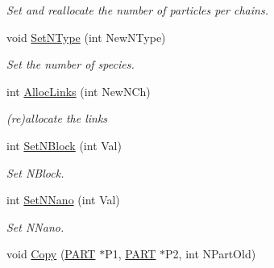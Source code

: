 \begin{DoxyCompactItemize}
\begin{DoxyCompactList}\small\item\em \-Set and reallocate the number of particles per chains. \end{DoxyCompactList}\item 
\hypertarget{classVarData_ab1caa779737fb8f3bb11375fd03cb4a7}{void \hyperlink{classVarData_ab1caa779737fb8f3bb11375fd03cb4a7}{\-Set\-N\-Type} (int \-New\-N\-Type)}\label{classVarData_ab1caa779737fb8f3bb11375fd03cb4a7}

\begin{DoxyCompactList}\small\item\em \-Set the number of species. \end{DoxyCompactList}\item 
\hypertarget{classVarData_a6dc8858a41c1a3851b2215c6460347bf}{int \hyperlink{classVarData_a6dc8858a41c1a3851b2215c6460347bf}{\-Alloc\-Links} (int \-New\-N\-Ch)}\label{classVarData_a6dc8858a41c1a3851b2215c6460347bf}

\begin{DoxyCompactList}\small\item\em (re)allocate the links \end{DoxyCompactList}\item 
\hypertarget{classVarData_a1ba38db0d91819c6627dbac8de45b6a7}{int \hyperlink{classVarData_a1ba38db0d91819c6627dbac8de45b6a7}{\-Set\-N\-Block} (int \-Val)}\label{classVarData_a1ba38db0d91819c6627dbac8de45b6a7}

\begin{DoxyCompactList}\small\item\em \-Set \-N\-Block. \end{DoxyCompactList}\item 
\hypertarget{classVarData_ad5e77b3ade14f7be0d91ccd0f5397cb6}{int \hyperlink{classVarData_ad5e77b3ade14f7be0d91ccd0f5397cb6}{\-Set\-N\-Nano} (int \-Val)}\label{classVarData_ad5e77b3ade14f7be0d91ccd0f5397cb6}

\begin{DoxyCompactList}\small\item\em \-Set \-N\-Nano. \end{DoxyCompactList}\item 
\hypertarget{classVarData_a4de27ea0167e58319a6848705a423e03}{void \hyperlink{classVarData_a4de27ea0167e58319a6848705a423e03}{\-Copy} (\hyperlink{structPART}{\-P\-A\-R\-T} $\ast$\-P1, \hyperlink{structPART}{\-P\-A\-R\-T} $\ast$\-P2, int \-N\-Part\-Old)}\label{classVarData_a4de27ea0167e58319a6848705a423e03}


\end{DoxyCompactItemize}
